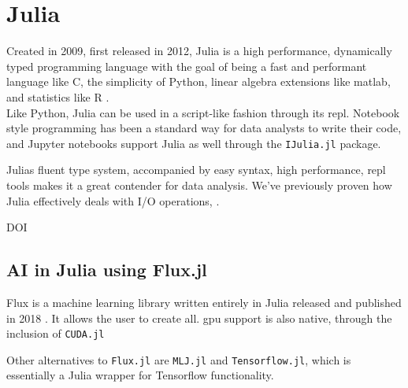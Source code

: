 \section{Julia}

Created in 2009, first released in 2012, Julia is a high performance, dynamically typed programming language with the goal of being a fast and performant language like C, the simplicity of Python, linear algebra extensions like matlab, and statistics like R \cite{julia}. \\ 

Like Python, Julia can be used in a script-like fashion through its \acrfull{repl}. Notebook style programming has been a standard way for data analysts to write their code, and Jupyter notebooks support Julia as well through the \texttt{IJulia.jl} package. 

Julias fluent type system, accompanied by easy syntax, high performance, \acrshort{repl} tools makes it a great contender for data analysis. We've previously proven how Julia effectively deals with I/O operations, \cite{projthesis}.


DOI \cite{doi:10.1137/141000671}

\subsection{AI in Julia using Flux.jl}
\label{back:flux}

Flux is a machine learning library written entirely in Julia released and published in 2018 \cite{Innes2018}. It allows the user to create all. \acrshort{gpu} support is also native, through the inclusion of \texttt{CUDA.jl}

Other alternatives to \texttt{Flux.jl} are \texttt{MLJ.jl} and \texttt{Tensorflow.jl}, which is essentially a Julia wrapper for Tensorflow functionality. 




